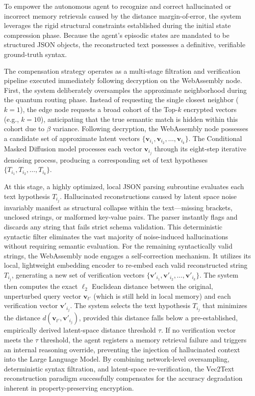 \documentclass[12pt]{article}
\begin{document}
To empower the autonomous agent to recognize and correct hallucinated or incorrect memory retrievals caused by the distance margin-of-error, the system leverages the rigid structural constraints established during the initial state compression phase. Because the agent's episodic states are mandated to be structured JSON objects, the reconstructed text possesses a definitive, verifiable ground-truth syntax.

The compensation strategy operates as a multi-stage filtration and verification pipeline executed immediately following decryption on the WebAssembly node. First, the system deliberately oversamples the approximate neighborhood during the quantum routing phase. Instead of requesting the single closest neighbor ($k=1$), the edge node requests a broad cohort of the Top-$k$ encrypted vectors (e.g., $k=10$), anticipating that the true semantic match is hidden within this cohort due to $\beta$ variance. Following decryption, the WebAssembly node possesses a candidate set of approximate latent vectors $\{\mathbf{v}_{i_1}, \mathbf{v}_{i_2}, \ldots, \mathbf{v}_{i_k}\}$. The Conditional Masked Diffusion model processes each vector $\mathbf{v}_{i_j}$ through its eight-step iterative denoising process, producing a corresponding set of text hypotheses $\{T_{i_1}, T_{i_2}, \ldots, T_{i_k}\}$.

At this stage, a highly optimized, local JSON parsing subroutine evaluates each text hypothesis $T_{i_j}$. Hallucinated reconstructions caused by latent space noise invariably manifest as structural collapse within the text—missing brackets, unclosed strings, or malformed key-value pairs. The parser instantly flags and discards any string that fails strict schema validation. This deterministic syntactic filter eliminates the vast majority of noise-induced hallucinations without requiring semantic evaluation. For the remaining syntactically valid strings, the WebAssembly node engages a self-correction mechanism. It utilizes its local, lightweight embedding encoder to re-embed each valid reconstructed string $T_{i_j}$, generating a new set of verification vectors $\{\mathbf{v}'_{i_1}, \mathbf{v}'_{i_2}, \ldots, \mathbf{v}'_{i_k}\}$. The system then computes the exact $\ell_2$ Euclidean distance between the original, unperturbed query vector $\mathbf{v}_{t'}$ (which is still held in local memory) and each verification vector $\mathbf{v}'_{i_j}$. The system selects the text hypothesis $T_{i_j}$ that minimizes the distance $d(\mathbf{v}_{t'}, \mathbf{v}'_{i_j})$, provided this distance falls below a pre-established, empirically derived latent-space distance threshold $\tau$. If no verification vector meets the $\tau$ threshold, the agent registers a memory retrieval failure and triggers an internal reasoning override, preventing the injection of hallucinated context into the Large Language Model. By combining network-level oversampling, deterministic syntax filtration, and latent-space re-verification, the Vec2Text reconstruction paradigm successfully compensates for the accuracy degradation inherent in property-preserving encryption.
\end{document}
